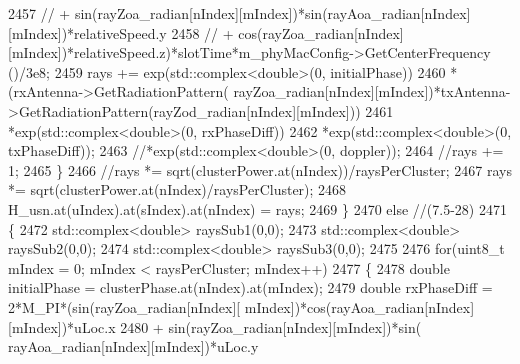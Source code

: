 \begin{DoxyCode}
2457                                                 \textcolor{comment}{//              +
       sin(rayZoa\_radian[nIndex][mIndex])*sin(rayAoa\_radian[nIndex][mIndex])*relativeSpeed.y}
2458                                                 \textcolor{comment}{//              +
       cos(rayZoa\_radian[nIndex][mIndex])*relativeSpeed.z)*slotTime*m\_phyMacConfig->GetCenterFrequency ()/3e8;}
2459                                                 rays += exp(std::complex<double>(0, initialPhase))
2460                                                                 *(rxAntenna->GetRadiationPattern(
      rayZoa\_radian[nIndex][mIndex])*txAntenna->GetRadiationPattern(rayZod\_radian[nIndex][mIndex]))
2461                                                                 *exp(std::complex<double>(0, rxPhaseDiff))
2462                                                                 *exp(std::complex<double>(0, txPhaseDiff));
2463                                                                 \textcolor{comment}{//*exp(std::complex<double>(0, doppler));}
2464                                                 \textcolor{comment}{//rays += 1;}
2465                                         \}
2466                                         \textcolor{comment}{//rays *= sqrt(clusterPower.at(nIndex))/raysPerCluster;}
2467                                         rays *= sqrt(clusterPower.at(nIndex)/raysPerCluster);
2468                                         H\_usn.at(uIndex).at(sIndex).at(nIndex) = rays;
2469                                 \}
2470                                 \textcolor{keywordflow}{else} \textcolor{comment}{//(7.5-28)}
2471                                 \{
2472                                         std::complex<double> raysSub1(0,0);
2473                                         std::complex<double> raysSub2(0,0);
2474                                         std::complex<double> raysSub3(0,0);
2475 
2476                                         \textcolor{keywordflow}{for}(uint8\_t mIndex = 0; mIndex < raysPerCluster; mIndex++)
2477                                         \{
2478                                                 \textcolor{keywordtype}{double} initialPhase = clusterPhase.at(nIndex).at(mIndex);
2479                                                 \textcolor{keywordtype}{double} rxPhaseDiff = 2*M\_PI*(sin(rayZoa\_radian[nIndex][
      mIndex])*cos(rayAoa\_radian[nIndex][mIndex])*uLoc.x
2480                                                                 + sin(rayZoa\_radian[nIndex][mIndex])*sin(
      rayAoa\_radian[nIndex][mIndex])*uLoc.y

\end{DoxyCode}

